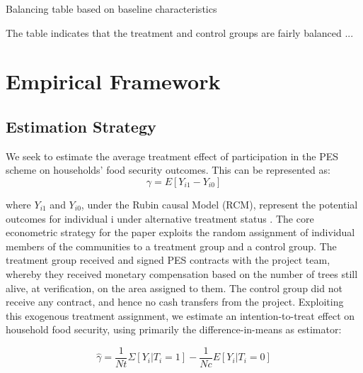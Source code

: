 \documentclass[preprint,12pt]{elsarticle}
\begin{document}
\begin{table}[ht!]
	\caption{Balancing table based on baseline characteristics}
	\centering
	\begin{adjustbox}{max width=1.0\linewidth}
		\label{tab:Balancing_tests}
	\end{adjustbox}
\end{table}
\FloatBarrier

The table indicates that the treatment and control groups are fairly balanced ...


\newpage 
\section{Empirical Framework}

\subsection{Estimation Strategy}
We seek to estimate the average treatment effect of participation in the PES scheme on households' food security outcomes. This can be represented as:
\begin{equation}
\gamma = E[Y_{i1}-Y_{i0}]
\end{equation}

where $Y_{i1}$ and $Y_{i0}$, under the Rubin causal Model (RCM), represent the potential outcomes for individual i under alternative treatment status \citet{holland1986statistics,rubin1974estimating}. The core econometric strategy for the paper exploits the random assignment of individual members of the communities to a treatment group and a control group. The treatment group received and signed PES contracts with the project team, whereby they received monetary compensation based on the number of trees still alive, at verification, on the area assigned to them. The control group did not receive any contract, and hence no cash transfers from the project. Exploiting this exogenous treatment assignment, we estimate an intention-to-treat effect on household food security, using primarily the difference-in-means as estimator: 

\begin{equation} \label{eq:ATE_equation}
\widehat{\gamma} = \frac{1}{N{t}} \Sigma [Y_{i}|T_i=1] - \frac{1}{N{c}} E[Y_{i}|T_i=0]
\end{equation}
\end{document}

